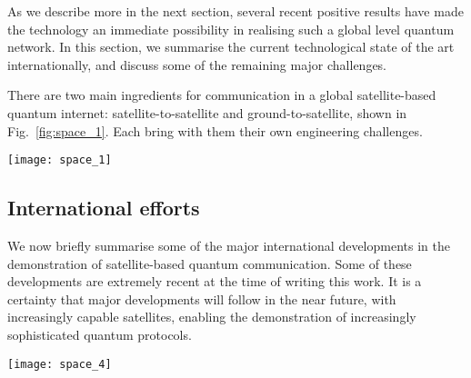 As we describe more in the next section, several recent positive results have made the technology an immediate possibility in realising such a global level quantum network. In this section, we summarise the current technological state of the art internationally, and discuss some of the remaining major challenges.  

There are two main ingredients for communication in a global satellite-based quantum internet: satellite-to-satellite and ground-to-satellite, shown in Fig.~\ref{fig:space_1}. Each bring with them their own engineering challenges.

\begin{figure*}[!htb]
\texttt{[image: space\_1]}
\caption{Various possibilities for space-based quantum communication. (a) Satellite-to-satellite quantum communication \cite{bib:byrnes2017lorentz}. (b) Ground-to-satellite quantum communication \cite{bib:armengol08}.}
\label{fig:space_1}
\end{figure*}

%
%


\subsection{International efforts}

We now briefly summarise some of the major international developments in the demonstration of satellite-based quantum communication. Some of these developments are extremely recent at the time of writing this work. It is a certainty that major developments will follow in the near future, with increasingly capable satellites, enabling the demonstration of increasingly sophisticated quantum protocols.

\begin{figure*}[!htb]
\texttt{[image: space\_4]}
\caption{The Chinese Micius quantum communications satellite. (a) Schematic of the satellite and ground stations used to observe the entangled photons \cite{bib:popkin17}. . (b) Attenuation during entanglement distribution from \cite{bib:yin2017satellite}. (c) Fidelities achieved for teleportation of various states as marked from \cite{bib:ren2017ground}.}
\label{fig:space_4}
\end{figure*}

